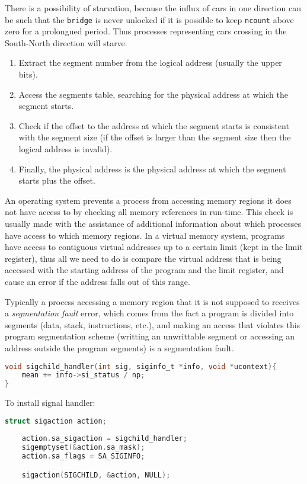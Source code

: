\documentclass{sope}
\begin{document}
There is a possibility of starvation, because the influx of cars in one direction can be such that the \texttt{bridge} is never unlocked if it is possible to keep \texttt{ncount} above zero for a prolongued period. Thus processes representing cars crossing in the South-North direction will starve.

\begin{enumerate}
    \item Extract the segment number from the logical address (usually the upper bits).
    \item Access the segments table, searching for the physical address at which the segment starts.
    \item Check if the offset to the address at which the segment starts is consistent with the segment size (if the offset is larger than the segment size then the logical address is invalid).
    \item Finally, the physical address is the physical address at which the segment starts plus the offset.
\end{enumerate}

An operating system prevents a process from accessing memory regions it does not have access to by checking all memory references in run-time. This check is usually made with the assistance of additional information about which processes have access to which memory regions. In a virtual memory system, programs have access to contiguous virtual addresses up to a certain limit (kept in the limit register), thus all we need to do is compare the virtual address that is being accessed with the starting address of the program and the limit register, and cause an error if the address falls out of this range.

Typically a process accessing a memory region that it is not supposed to receives a \emph{segmentation fault} error, which comes from the fact a program is divided into segments (data, stack, instructions, etc.), and making an access that violates this program segmentation scheme (writting an unwrittable segment or accessing an address outside the program segments) is a segmentation fault.

\begin{lstlisting}[language=C]
void sigchild_handler(int sig, siginfo_t *info, void *ucontext){
    mean += info->si_status / np;
}
\end{lstlisting}
To install signal handler:
\begin{lstlisting}[language=C]
    struct sigaction action;
    
    action.sa_sigaction = sigchild_handler;
    sigemptyset(&action.sa_mask);
    action.sa_flags = SA_SIGINFO;

    sigaction(SIGCHILD, &action, NULL);
\end{lstlisting}
\end{document}
